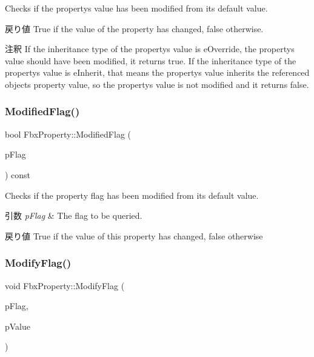 Checks if the property\textquotesingle{}s value has been modified from its default value. \begin{DoxyReturn}{戻り値}
{\ttfamily True} if the value of the property has changed, {\ttfamily false} otherwise. 
\end{DoxyReturn}
\begin{DoxyRemark}{注釈}
If the inheritance type of the property\textquotesingle{}s value is e\+Override, the property\textquotesingle{}s value should have been modified, it returns {\ttfamily true}. If the inheritance type of the property\textquotesingle{}s value is e\+Inherit, that means the property\textquotesingle{}s value inherits the referenced object\textquotesingle{}s property value, so the property\textquotesingle{}s value is not modified and it returns {\ttfamily false}. 
\end{DoxyRemark}
\mbox{\label{class_fbx_property_ab89605d755ba9030d8a03819741dbafb}} 
\subsubsection{\texorpdfstring{Modified\+Flag()}{ModifiedFlag()}}
{\footnotesize\ttfamily bool Fbx\+Property\+::\+Modified\+Flag (\begin{DoxyParamCaption}\item[{\hyperlink{class_fbx_property_flags_afabfa7e0949aac8a7dcdf8a141867e99}{Fbx\+Property\+Flags\+::\+E\+Flags}}]{p\+Flag }\end{DoxyParamCaption}) const}

Checks if the property flag has been modified from its default value. 
\begin{DoxyParams}{引数}
{\em p\+Flag} & The flag to be queried. \\
\hline
\end{DoxyParams}
\begin{DoxyReturn}{戻り値}
{\ttfamily True} if the value of this property has changed, {\ttfamily false} otherwise 
\end{DoxyReturn}
\mbox{\label{class_fbx_property_a16da0381546978afc477b033239f1fc9}} 
\subsubsection{\texorpdfstring{Modify\+Flag()}{ModifyFlag()}}
{\footnotesize\ttfamily void Fbx\+Property\+::\+Modify\+Flag (\begin{DoxyParamCaption}\item[{\hyperlink{class_fbx_property_flags_afabfa7e0949aac8a7dcdf8a141867e99}{Fbx\+Property\+Flags\+::\+E\+Flags}}]{p\+Flag,  }\item[{bool}]{p\+Value }\end{DoxyParamCaption})}

